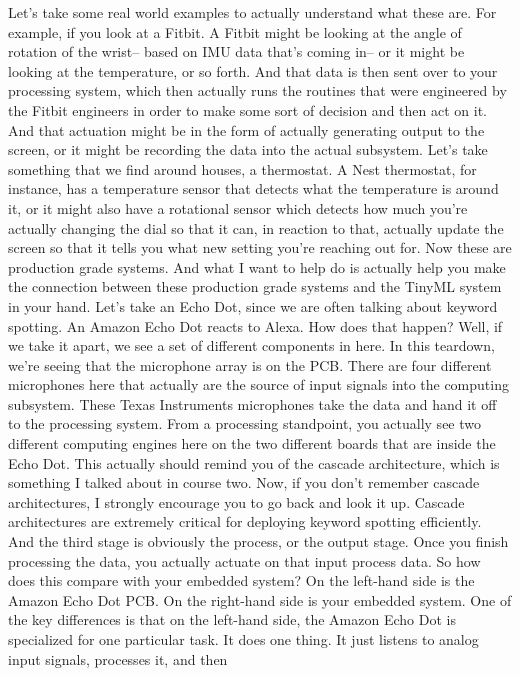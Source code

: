 Let's take some real world examples to actually understand what these are.
For example, if you look at a Fitbit.
A Fitbit might be looking at the angle of rotation of the wrist--
based on IMU data that's coming in-- or it might be looking at the temperature,
or so forth.
And that data is then sent over to your processing system, which
then actually runs the routines that were engineered by the Fitbit engineers
in order to make some sort of decision and then act on it.
And that actuation might be in the form of actually generating output
to the screen, or it might be recording the data into the actual subsystem.
Let's take something that we find around houses, a thermostat.
A Nest thermostat, for instance, has a temperature sensor
that detects what the temperature is around it,
or it might also have a rotational sensor which
detects how much you're actually changing the dial so that it can,
in reaction to that, actually update the screen so that it tells you what
new setting you're reaching out for.
Now these are production grade systems.
And what I want to help do is actually help
you make the connection between these production grade systems
and the TinyML system in your hand.
Let's take an Echo Dot, since we are often talking about keyword spotting.
An Amazon Echo Dot reacts to Alexa.
How does that happen?
Well, if we take it apart, we see a set of different components in here.
In this teardown, we're seeing that the microphone array is on the PCB.
There are four different microphones here
that actually are the source of input signals into the computing subsystem.
These Texas Instruments microphones take the data
and hand it off to the processing system.
From a processing standpoint, you actually
see two different computing engines here on the two different boards
that are inside the Echo Dot.
This actually should remind you of the cascade architecture, which is
something I talked about in course two.
Now, if you don't remember cascade architectures,
I strongly encourage you to go back and look it up.
Cascade architectures are extremely critical for deploying keyword
spotting efficiently.
And the third stage is obviously the process, or the output stage.
Once you finish processing the data, you actually
actuate on that input process data.
So how does this compare with your embedded system?
On the left-hand side is the Amazon Echo Dot PCB.
On the right-hand side is your embedded system.
One of the key differences is that on the left-hand side,
the Amazon Echo Dot is specialized for one particular task.
It does one thing.
It just listens to analog input signals, processes it, and then

